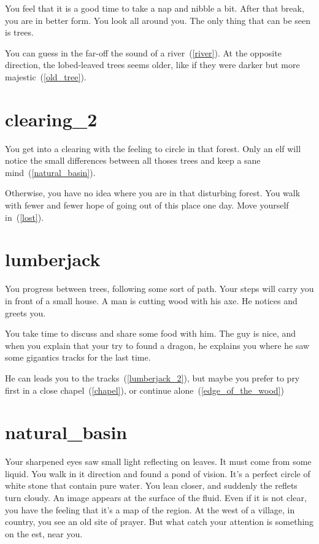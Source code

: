 You feel that it is a good time to take a nap and nibble a bit. After that
break, you are in better form. You look all around you. The only thing that can
be seen is trees.

You can guess in the far-off the sound of a river~(\ref{river}). At the opposite
direction, the lobed-leaved trees seems older, like if they were darker but more
majestic~(\ref{old_tree}).

\section{clearing_2}

You get into a clearing with the feeling to circle in that forest. Only an elf
will notice the small differences between all thoses trees and keep a sane
mind~(\ref{natural_basin}).

Otherwise, you have no idea where you are in that disturbing forest. You walk
with fewer and fewer hope of going out of this place one day. Move yourself
in~(\ref{lost}).

\section{lumberjack}

You progress between trees, following some sort of path. Your steps will carry
you in front of a small house. A man is cutting wood with his axe. He notices
and greets you.

You take time to discuss and share some food with him. The guy is nice, and when
you explain that your try to found a dragon, he explains you where he saw some
gigantics tracks for the last time.

He can leads you to the tracks~(\ref{lumberjack_2}), but maybe you prefer to pry
first in a close chapel~(\ref{chapel}), or continue alone~(\ref{edge_of_the_wood})

\section{natural_basin}

Your sharpened eyes saw small light reflecting on leaves. It must come from some
liquid. You walk in it direction and found a pond of vision. It's a perfect
circle of white stone that contain pure water. You lean closer, and suddenly the
reflets turn cloudy. An image appears at the surface of the fluid. Even if it
is not clear, you have the feeling that it's a map of the region. At the west of
a village, in country, you see an old site of prayer. But what catch your
attention is something on the est, near you.

